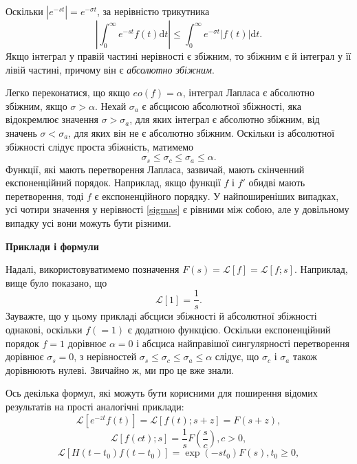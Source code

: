 \documentclass[14pt,twoside]{extreport}
\theoremstyle{mystyle}
\numberwithin{equation}{chapter}
\begin{document}
Оскільки $|e^{-st}|=e^{-\sigma t}$, за нерівністю трикутника
\begin{equation*}
	\left|\displaystyle \int_{0}^{\infty}e^{-st}f(t)\mathrm{d}t\right|\leqslant\int_{0}^{\infty}e^{-\sigma t}|f(t)|\mathrm{d}t.
\end{equation*}
Якщо інтеграл у правій частині нерівності є збіжним, то збіжним є й інтеграл у її лівій частині, причому він є \emph{абсолютно збіжним}.

Легко переконатися, що якщо $eo(f)=\alpha$, інтеграл Лапласа є абсолютно збіжним, якщо $\sigma>\alpha$. Нехай $\sigma_{a}$ є абсцисою абсолютної збіжності, яка відокремлює значення $\sigma>\sigma_{a}$, для яких інтеграл є абсолютно збіжним, від значень $\sigma<\sigma_{a}$, для яких він не є абсолютно збіжним. Оскільки із абсолютної збіжності слідує проста збіжність, матимемо
\begin{equation}\label{sigmas}
	\sigma_{s}\leqslant\sigma_{c}\leqslant\sigma_{a}\leqslant\alpha.
\end{equation}
Функції, які мають перетворення Лапласа, зазвичай, мають скінченний експоненційний порядок. Наприклад, якщо функції $f$ і $f'$ обидві мають перетворення, тоді $f$ є експоненційного порядку. У найпоширеніших випадках, усі чотири значення у нерівності \eqref{sigmas} є рівними між собою, але у довільному випадку усі вони можуть бути різними.

\textbf{Приклади і формули}

Надалі, використовуватимемо позначення $F(s)=\mathcal{L}[f]=\mathcal{L}[f;s]$. Наприклад, вище було показано, що
\begin{equation*}
	\mathcal{L}[1]=\dfrac{1}{s}.
\end{equation*}
Зауважте, що у цьому прикладі абсциси збіжності й абсолютної збіжності однакові, оскільки $f(=1)$ є додатною функцією. Оскільки експоненційний порядок $f=1$ дорівнює $\alpha=0$ і абсциса найправішої сингулярності перетворення дорівнює $\sigma_{s}=0$, з нерівностей $\sigma_{s}\leqslant\sigma_{c}\leqslant\sigma_{a}\leqslant\alpha$ слідує, що $\sigma_{c}$ і $\sigma_{a}$ також дорівнюють нулеві. Звичайно ж, ми про це вже знали.

Ось декілька формул, які можуть бути корисними для поширення відомих результатів на прості аналогічні приклади:
\begin{equation*}
	\mathcal{L}[e^{-zt}f(t)]=\mathcal{L}[f(t);s+z]=F(s+z),
\end{equation*}
\begin{equation*}
	\mathcal{L}[f(ct);s]=\dfrac{1}{s}F\left(\dfrac{s}{c}\right), c>0,
\end{equation*}
\begin{equation*}
	\mathcal{L}[H(t-t_{0})f(t-t_{0})]=\exp(-st_{0})F(s), t_{0}\geqslant 0,
\end{equation*}
\end{document}
